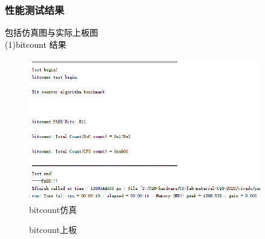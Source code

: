 \subsubsection{性能测试结果}
\textcolor{black}{包括仿真图与实际上板图}\\
\textcolor{black}{(1)bitcount 结果}\\
\begin{figure}[htbp]
    \centering
    \includegraphics[width=0.9\textwidth]{image/bitcountS.png}
    \caption{bitcount仿真}
\end{figure}

\begin{figure}[htbp]
    \centering
    \caption{bitcount上板}
\end{figure}

